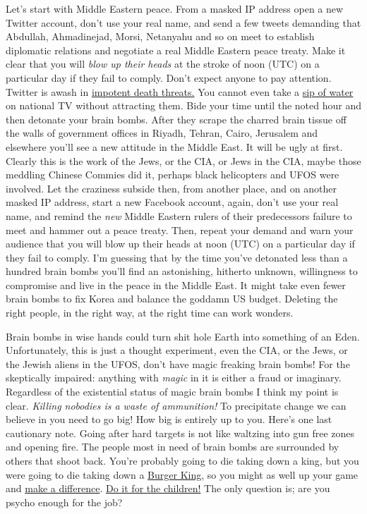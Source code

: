 Let's start with Middle Eastern peace. From a masked IP address open a
new Twitter account, don't use your real name, and send a few tweets
demanding that Abdullah, Ahmadinejad, Morsi, Netanyahu and so on meet to
establish diplomatic relations and negotiate a real Middle Eastern peace
treaty. Make it clear that you will \emph{blow up their heads} at the
stroke of noon (UTC) on a particular day if they fail to comply. Don't
expect anyone to pay attention. Twitter is awash in
\href{http://www.nbcnews.com/technology/technolog/justin-bieber-army-fills-twitter-death-threats-again-125690}{impotent
death threats.} You cannot even take a
\href{http://www.myfoxdetroit.com/story/21141805/rubios-water-break}{sip
of water} on national TV without attracting them. Bide your time until
the noted hour and then detonate your brain bombs. After they scrape the
charred brain tissue off the walls of government offices in Riyadh,
Tehran, Cairo, Jerusalem and elsewhere you'll see a new attitude in the
Middle East. It will be ugly at first. Clearly this is the work of the
Jews, or the CIA, or Jews in the CIA, maybe those meddling Chinese
Commies did it, perhaps black helicopters and UFOS were involved. Let
the craziness subside then, from another place, and on another masked IP
address, start a new Facebook account, again, don't use your real name,
and remind the \emph{new} Middle Eastern rulers of their predecessors
failure to meet and hammer out a peace treaty. Then, repeat your demand
and warn your audience that you will blow up their heads at noon (UTC)
on a particular day if they fail to comply. I'm guessing that by the
time you've detonated less than a hundred brain bombs you'll find an
astonishing, hitherto unknown, willingness to compromise and live in the
peace in the Middle East. It might take even fewer brain bombs to fix
Korea and balance the goddamn US budget. Deleting the right people, in
the right way, at the right time can work wonders.

Brain bombs in wise hands could turn shit hole Earth into something of
an Eden. Unfortunately, this is just a thought experiment, even the CIA,
or the Jews, or the Jewish aliens in the UFOS, don't have magic freaking
brain bombs! For the skeptically impaired: anything with \emph{magic} in
it is either a fraud or imaginary. Regardless of the existential status
of magic brain bombs I think my point is clear. \emph{Killing nobodies
is a waste of ammunition!} To precipitate change we can believe in you
need to go big! How big is entirely up to you. Here's one last
cautionary note. Going after hard targets is not like waltzing into gun
free zones and opening fire. The people most in need of brain bombs are
surrounded by others that shoot back. You're probably going to die
taking down a king, but you were going to die taking down a
\href{http://forum.prisonplanet.com/index.php?topic=95261.0;wap2}{Burger
King}, so you might as well up your game and 
\href{http://www.aboundlessworld.com/why-most-movements-are-bullshit-and-how-to-actually-make-a-difference/}{make a difference}. 
\href{http://imgur.com/Ph5dE}{Do it for the children!} The only question 
is; are you psycho enough for the job?



%